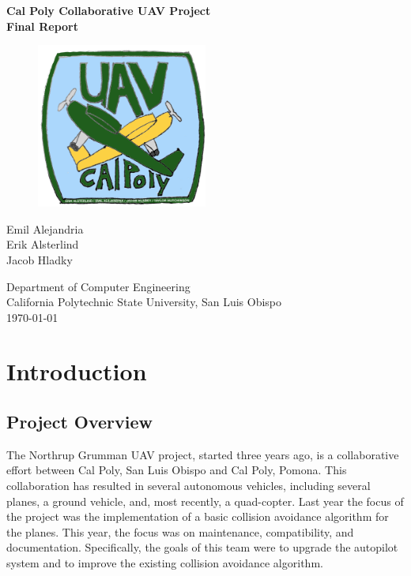 \documentclass[12pt]{article}
\begin{document}
\begin{titlepage}
  \begin{center}
    \vspace*{1cm} {
      \Huge\textbf{
        Cal Poly Collaborative UAV Project\\
        \bigskip
        Final Report
    }}

    \vspace*{1.5cm}

    \begin{figure}[ht!]
      \centering
      \includegraphics[width=0.5\textwidth]{logo.png}
    \end{figure}

    \vfill {
      \large
      Emil Alejandria\\
      Erik Alsterlind\\
      Jacob Hladky\\
    }

    \vspace{1cm}

    {
      \large
      Department of Computer Engineering\\
      California Polytechnic State University, San Luis Obispo\\
      \today
    }

  \end{center}
\end{titlepage}


\tableofcontents
\clearpage


\section{Introduction}

\subsection{Project Overview}
The Northrup Grumman UAV project, started three years ago, is a collaborative effort between Cal Poly, San Luis Obispo and Cal Poly, Pomona. This collaboration has resulted in several autonomous vehicles, including several planes, a ground vehicle, and, most recently, a quad-copter. Last year the focus of the project was the implementation of a basic collision avoidance algorithm for the planes. This year, the focus was on maintenance, compatibility, and documentation. Specifically, the goals of this team were to upgrade the autopilot system and to improve the existing collision avoidance algorithm.
\end{document}
